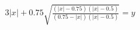 \documentclass[preview]{standalone}
\begin{document}
\begin{align*}
3|x| + 0.75 \sqrt{\frac{(|x|-0.75)(|x|-0.5)}{(0.75-|x|)(|x|-0.5)}} = y
\end{align*}
\end{document}

